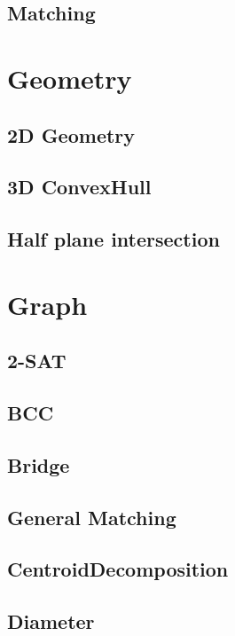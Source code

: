 \subsection{Matching}


\section{Geometry}
\subsection{2D Geometry}

\subsection{3D ConvexHull}

\subsection{Half plane intersection}



\section{Graph}
\subsection{2-SAT}

\subsection{BCC}

\subsection{Bridge}

\subsection{General Matching}

\subsection{CentroidDecomposition}

\subsection{Diameter}

